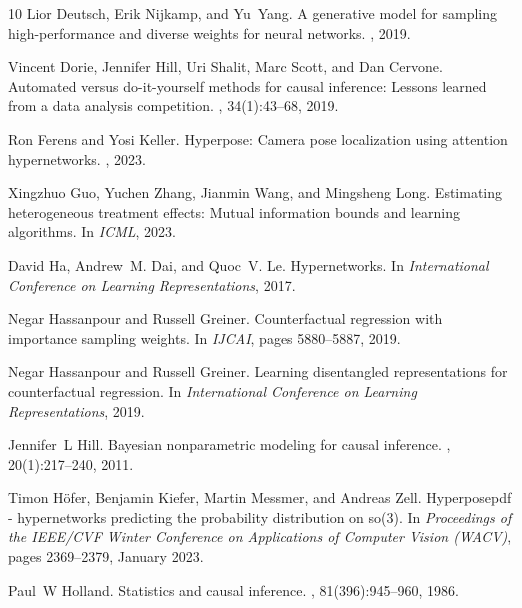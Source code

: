 \documentclass{article}
\begin{document}
\begin{thebibliography}{10}
	Lior Deutsch, Erik Nijkamp, and Yu~Yang.
	\newblock A generative model for sampling high-performance and diverse weights
	for neural networks.
	, 2019.
	
	Vincent Dorie, Jennifer Hill, Uri Shalit, Marc Scott, and Dan Cervone.
	\newblock Automated versus do-it-yourself methods for causal inference: Lessons
	learned from a data analysis competition.
	, 34(1):43--68, 2019.
	
	Ron Ferens and Yosi Keller.
	\newblock Hyperpose: Camera pose localization using attention hypernetworks.
	, 2023.
	
	Xingzhuo Guo, Yuchen Zhang, Jianmin Wang, and Mingsheng Long.
	\newblock Estimating heterogeneous treatment effects: Mutual information bounds
	and learning algorithms.
	\newblock In {\em ICML}, 2023.
	
	David Ha, Andrew~M. Dai, and Quoc~V. Le.
	\newblock Hypernetworks.
	\newblock In {\em International Conference on Learning Representations}, 2017.
	
	Negar Hassanpour and Russell Greiner.
	\newblock Counterfactual regression with importance sampling weights.
	\newblock In {\em IJCAI}, pages 5880--5887, 2019.
	
	Negar Hassanpour and Russell Greiner.
	\newblock Learning disentangled representations for counterfactual regression.
	\newblock In {\em International Conference on Learning Representations}, 2019.
	
	Jennifer~L Hill.
	\newblock Bayesian nonparametric modeling for causal inference.
	,
	20(1):217--240, 2011.
	
	Timon H\"ofer, Benjamin Kiefer, Martin Messmer, and Andreas Zell.
	\newblock Hyperposepdf - hypernetworks predicting the probability distribution
	on so(3).
	\newblock In {\em Proceedings of the IEEE/CVF Winter Conference on Applications
		of Computer Vision (WACV)}, pages 2369--2379, January 2023.
	
	Paul~W Holland.
	\newblock Statistics and causal inference.
	,
	81(396):945--960, 1986.
	

\end{thebibliography}
\end{document}
